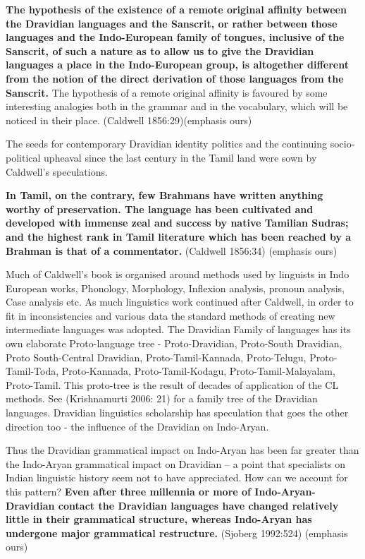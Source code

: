 \begin{myquote}
\textbf{The hypothesis of the existence of a remote original affinity between the Dravidian languages and the Sanscrit, or rather between those languages and the Indo-European family of tongues, inclusive of the Sanscrit, of such a nature as to allow us to give the Dravidian languages a place in the Indo-European group, is altogether different from the notion of the direct derivation of those languages from the Sanscrit.} The hypothesis of a remote original affinity is favoured by some interesting analogies both in the grammar and in the vocabulary, which will be noticed in their place. (Caldwell 1856:29)(emphasis ours)
\end{myquote}

The seeds for contemporary Dravidian identity politics and the continuing socio-political upheaval since the last century in the Tamil land were sown by Caldwell’s speculations.

\newpage

\begin{myquote}
\textbf{In Tamil, on the contrary, few Brahmans have written anything worthy of preservation. The language has been cultivated and developed with immense zeal and success by native Tamilian Sudras; and the highest rank in Tamil literature which has been reached by a Brahman is that of a commentator.} (Caldwell 1856:34) (emphasis ours)
\end{myquote}

Much of Caldwell’s book is organised around methods used by linguists in Indo European works, Phonology, Morphology, Inflexion analysis, pronoun analysis, Case analysis etc. As much linguistics work continued after Caldwell, in order to fit in inconsistencies and various data the standard methods of creating new intermediate languages was adopted. The Dravidian Family of languages has its own elaborate Proto-language tree - Proto-Dravidian, Proto-South Dravidian, Proto South-Central Dravidian, Proto-Tamil-Kannada, Proto-Telugu, Proto-Tamil-Toda, Proto-Kannada, Proto-Tamil-Kodagu, Proto-Tamil-Malayalam, Proto-Tamil. This proto-tree is the result of decades of application of the CL methods. See (Krishnamurti 2006: 21) for a family tree of the Dravidian languages. Dravidian linguistics scholarship has speculation that goes the other direction too - the influence of the Dravidian on Indo-Aryan.

\begin{myquote}
Thus the Dravidian grammatical impact on Indo-Aryan has been far greater than the Indo-Aryan grammatical impact on Dravidian – a point that specialists on Indian linguistic history seem not to have appreciated. How can we account for this pattern? \textbf{Even after three millennia or more of Indo-Aryan-Dravidian contact the Dravidian languages have changed relatively little in their grammatical structure, whereas Indo-Aryan has undergone major grammatical restructure.} (Sjoberg 1992:524) (emphasis ours)
\end{myquote}

